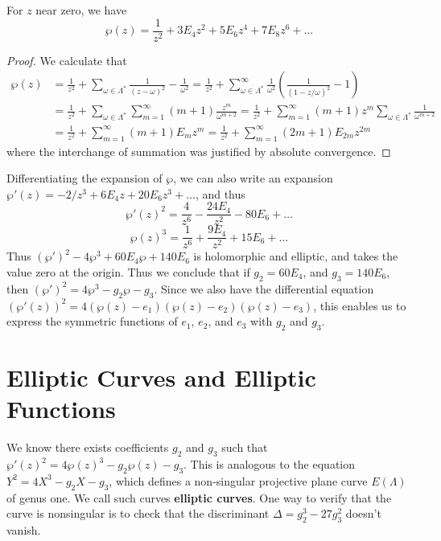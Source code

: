 \begin{theorem}
    For $z$ near zero, we have
    \[ \wp(z) = \frac{1}{z^2} + 3E_4 z^2 + 5E_6 z^4 + 7 E_8 z^6 + \dots \]
\end{theorem}
\begin{proof}
    We calculate that
    \begin{align*}
        \wp(z) &= \frac{1}{z^2} + \sum_{\omega \in \Lambda^*} \frac{1}{(z - \omega)^2} - \frac{1}{\omega^2} = \frac{1}{z^2} + \sum_{\omega \in \Lambda^*}^\infty \frac{1}{\omega^2} \left( \frac{1}{(1 - z/\omega)^2} - 1 \right)\\
        &= \frac{1}{z^2} + \sum_{\omega \in \Lambda^*} \sum_{m = 1}^\infty (m+1) \frac{z^m}{\omega^{m + 2}} = \frac{1}{z^2} + \sum_{m = 1}^\infty (m+1) z^m \sum_{\omega \in \Lambda^*} \frac{1}{\omega^{m+2}}\\
        &= \frac{1}{z^2} + \sum_{m = 1}^\infty (m+1) E_m z^m = \frac{1}{z^2} + \sum_{m = 1}^\infty (2m+1) E_{2m} z^{2m}
    \end{align*}
    where the interchange of summation was justified by absolute convergence.
\end{proof}

Differentiating the expansion of $\wp$, we can also write an expansion $\wp'(z) = -2/z^3 + 6E_4z + 20E_6z^3 + \dots$, and thus
\[    \wp'(z)^2 = \frac{4}{z^6} - \frac{24 E_4}{z^2} - 80 E_6 + \dots \]
\[    \wp(z)^3 = \frac{1}{z^6} + \frac{9E_4}{z^2} + 15 E_6 + \dots \]
%
Thus $(\wp')^2 - 4 \wp^3 + 60 E_4 \wp + 140 E_6$ is holomorphic and elliptic, and takes the value zero at the origin. Thus we conclude that if $g_2 = 60E_4$, and $g_3 = 140 E_6$, then $(\wp')^2 = 4\wp^3 - g_2 \wp - g_3$. Since we also have the differential equation $(\wp'(z))^2 = 4(\wp(z) - e_1) (\wp(z) - e_2)(\wp(z) - e_3)$, this enables us to express the symmetric functions of $e_1$, $e_2$, and $e_3$ with $g_2$ and $g_3$.

\section{Elliptic Curves and Elliptic Functions}

We know there exists coefficients $g_2$ and $g_3$ such that $\wp'(z)^2 = 4 \wp(z)^3 - g_2 \wp(z) - g_3$. This is analogous to the equation $Y^2 = 4X^3 - g_2 X - g_3$, which defines a non-singular projective plane curve $E(\Lambda)$ of genus one. We call such curves {\bf elliptic curves}. One way to verify that the curve is nonsingular is to check that the discriminant $\Delta = g_2^3 - 27g_3^2$ doesn't vanish.

